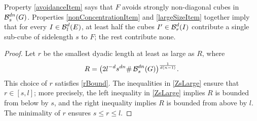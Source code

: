 \begin{remark}
	Property \ref{avoidanceItem} says that $F$ avoids strongly non-diagonal cubes in $\operatorname{\mathcal{B}}^{dn}_s(G)$. Properties \ref{nonConcentrationItem} and \ref{largeSizeItem} together imply that for every $I \in \operatorname{\mathcal{B}}^d_l(E)$, at least half the cubes $I'\in \operatorname{\mathcal{B}}_r^d(I)$ contribute a single sub-cube of sidelength $s$ to $F$; the rest contribute none. 
\end{remark}

\begin{proof}
	Let $r$ be the smallest dyadic length at least as large as $R$, where
	\begin{equation} \label{What-is-r}
		R = \big(2 l^{-d}s^{dn}\# \operatorname{\mathcal{B}}^{dn}_s(G)\big)^{\frac{1}{d(n-1)}}.
	\end{equation} 
	This choice of $r$ satisfies \eqref{rBound}. 
	The inequalities in \eqref{ZsLarge} ensure that $r \in [s,l]$; more precisely, the left inequality in \eqref{ZsLarge} implies $R$ is bounded from below by $s$, and the right inequality implies $R$ is bounded from above by $l$. The minimality of $r$ ensures $s \leq r \leq l$.


\end{proof}
